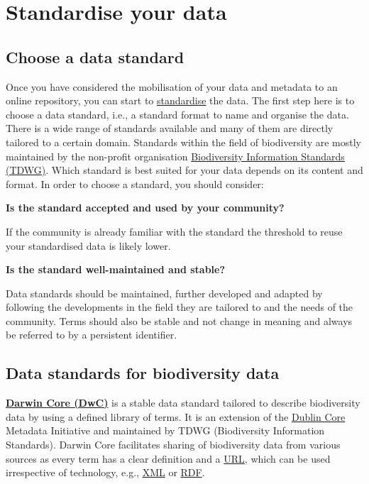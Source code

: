 \documentclass[
]{book}
\begin{document}
\hypertarget{standardise-your-data}{%
\chapter{Standardise your data}\label{standardise-your-data}}

\hypertarget{choose-a-data-standard}{%
\section{Choose a data standard}\label{choose-a-data-standard}}

Once you have considered the mobilisation of your data and metadata to an online repository, you can start to \protect\hyperlink{standardise}{standardise} the data. The first step here is to choose a data standard, i.e., a standard format to name and organise the data. There is a wide range of standards available and many of them are directly tailored to a certain domain. Standards within the field of biodiversity are mostly maintained by the non-profit organisation \href{https://www.tdwg.org/}{Biodiversity Information Standards (TDWG)}. Which standard is best suited for your data depends on its content and format. In order to choose a standard, you should consider:

\textbf{Is the standard accepted and used by your community?}

If the community is already familiar with the standard the threshold to reuse your standardised data is likely lower.

\textbf{Is the standard well-maintained and stable?}

Data standards should be maintained, further developed and adapted by following the developments in the field they are tailored to and the needs of the community. Terms should also be stable and not change in meaning and always be referred to by a persistent identifier.

\hypertarget{data-standards-for-biodiversity-data}{%
\section{Data standards for biodiversity data}\label{data-standards-for-biodiversity-data}}

\href{https://dwc.tdwg.org/}{\textbf{Darwin Core (DwC)}} is a stable data standard tailored to describe biodiversity data by using a defined library of terms. It is an extension of the \protect\hyperlink{dublincore}{Dublin Core} Metadata Initiative and maintained by TDWG (Biodiversity Information Standards). Darwin Core facilitates sharing of biodiversity data from various sources as every term has a clear definition and a \protect\hyperlink{URI}{URL}, which can be used irrespective of technology, e.g., \protect\hyperlink{XML}{XML} or \protect\hyperlink{RDF}{RDF}.
\end{document}
